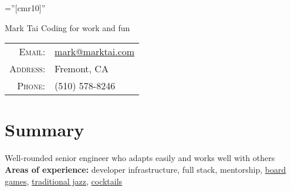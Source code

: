 \documentclass[a4paper,10pt]{article}
\begin{document}
\tracingall

\pagestyle{empty} %

\font\fb=''[cmr10]'' %



\begin{minipage}{0.7\textwidth}%
\par{
	{\fontsize{40}{50}\selectfont Mark Tai}
	\Large \hspace{.2em} Coding for work and fun
    }
\end{minipage}%
\hfill%
\begin{minipage}{0.3\textwidth}
\begin{tabular}{r|l}
    \textsc{Email:}     & \href{mailto:mark@marktai.com}{mark@marktai.com} \\
    \textsc{Address:}   & Fremont, CA \\
    \textsc{Phone:}     & (510) 578-8246\\
\end{tabular}
\end{minipage}

\section{Summary}
\textbullet \hspace{.1em} Well-rounded senior engineer who adapts easily and works well with others \\
\textbullet \hspace{.1em} \textbf{Areas of experience:} developer infrastructure, full stack, mentorship, \href{https://clover.marktai.com}{board games}, \href{http://music.marktai.com}{traditional jazz}, \href{http://menu.marktai.com}{cocktails}\\

\end{document}
